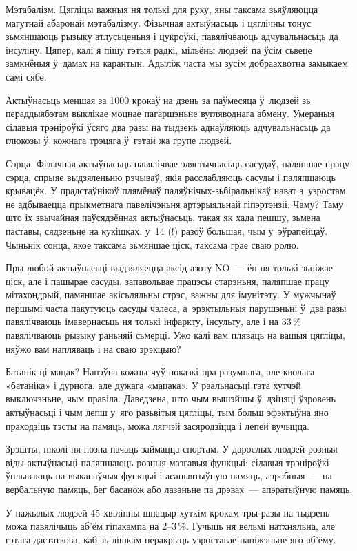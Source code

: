 Мэтабалізм. Цягліцы важныя ня толькі для руху, яны таксама зьяўляюцца магутнай абаронай мэтабалізму. Фізычная актыўнасьць і цяглічны тонус зьмяншаюць рызыку атлусьценьня і цукроўкі, павялічваюць адчувальнасьць да інсуліну. Цяпер, калі я пішу гэтыя радкі, мільёны людзей па ўсім сьвеце замкнёныя ў~дамах на карантын. Адыліж часта мы зусім добраахвотна замыкаем самі сябе.

Актыўнасьць меншая за 1000 крокаў на дзень за паўмесяца ў~людзей зь пераддыябэтам выклікае моцнае пагаршэньне вугляводнага абмену. Умераныя сілавыя трэніроўкі ўсяго два разы на тыдзень аднаўляюць адчувальнасьць да глюкозы ў~кожнага трэцяга ў~гэтай жа групе людзей.

Сэрца. Фізычная актыўнасьць павялічвае элястычнасьць сасудаў, паляпшае працу сэрца, спрыяе выдзяленьню рэчываў, якія расслабляюць сасуды і паляпшаюць крывацёк. У прадстаўнікоў плямёнаў паляўнічых-зьбіральнікаў нават з~узростам не адбываецца прыкметнага павелічэньня артэрыяльнай гіпэртэнзіі. Чаму? Таму што іх звычайная паўсядзённая актыўнасьць, такая як хада пешшу, зьмена паставы, сядзеньне на кукішках, у~14 (!) разоў большая, чым у~эўрапейцаў. Чыньнік сонца, якое таксама зьмяншае ціск, таксама грае сваю ролю.

Пры любой актыўнасьці выдзяляецца аксід азоту NO~--- ён ня толькі зьніжае ціск, але і пашырае сасуды, запавольвае працэсы старэньня, паляпшае працу мітахондрый, памяншае акісьляльны стрэс, важны для імунітэту. У мужчынаў першымі часта пакутуюць сасуды чэлеса, а~эрэктыльныя парушэньні ў~два разы павялічваюць імавернасьць ня толькі інфаркту, інсульту, але і на 33\,\% павялічваюць рызыку раньняй сьмерці. Ужо калі вам пляваць на вашыя цягліцы, няўжо вам напляваць і на сваю эрэкцыю?

Батанік ці мацак? Напэўна кожны чуў показкі пра разумнага, але кволага «батаніка» і дурнога, але дужага «мацака». У рэальнасьці гэта хутчэй выключэньне, чым правіла. Даведзена, што чым вышэйшы ў~дзіцяці ўзровень актыўнасьці і чым лепш у~яго разьвітыя цягліцы, тым больш эфэктыўна яно праходзіць тэсты на памяць, можа лягчэй засяродзіцца і лепей вучыцца.

Зрэшты, ніколі ня позна пачаць займацца спортам. У дарослых людзей розныя віды актыўнасьці паляпшаюць розныя мазгавыя функцыі: сілавыя трэніроўкі ўплываюць на выканаўчыя функцыі і асацыятыўную памяць, аэробныя~--- на вербальную памяць, бег басанож або лазаньне па дрэвах~--- апэратыўную памяць.

У пажылых людзей 45-хвілінны шпацыр хуткім крокам тры разы на тыдзень можа павялічыць аб'ём гіпакампа на 2--3\,\%. Гучыць ня вельмі натхняльна, але гэтага дастаткова, каб зь лішкам перакрыць узроставае паніжэньне яго аб'ёму.

